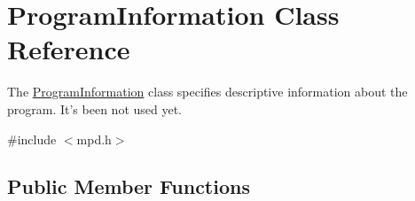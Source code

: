 \hypertarget{class_program_information}{\section{Program\-Information Class Reference}
\label{class_program_information}
}


The \hyperlink{class_program_information}{Program\-Information} class specifies descriptive information about the program. It's been not used yet.  




{\ttfamily \#include $<$mpd.\-h$>$}

\subsection*{Public Member Functions}
